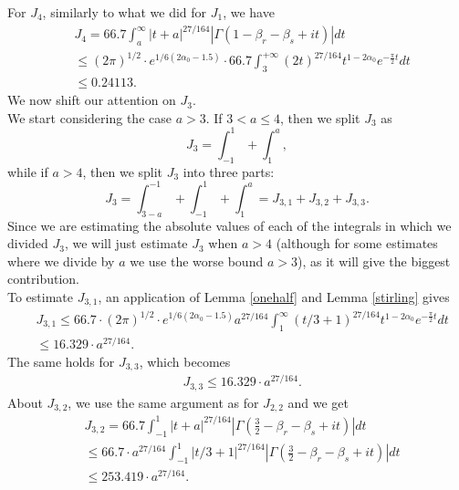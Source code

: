 \documentclass[reqno]{amsart}
\numberwithin{equation}{section}
\theoremstyle{remark}
\begin{document}
   For $J_4$, similarly to what we did for $J_1$, we have
    \begin{equation*}
        \begin{aligned}
            &J_4=66.7\int_{ a}^{\infty}\left|t+a\right|^{27/164}\left|\Gamma\left(1-\beta_r-\beta_s+it\right)\right|dt\\&\le (2\pi)^{1/2}\cdot e^{1/6(2\alpha_0-1.5)}\cdot 66.7 \int_{3}^{+\infty}(2t)^{ 27/164}t^{1-2\alpha_0}e^{-\frac{\pi}{2}t}dt\\&\le 0.24113.
        \end{aligned}
    \end{equation*}
    We now shift our attention on $J_3$.\\
    We start considering the case $a>3$. If $3<a\le 4$, then we split $J_3$ as 
    \[
    J_3=\int_{-1}^1+\int_{1}^a,
    \]
    while if $a>4$, then we split $J_3$ into three parts:
    \[
    J_3=\int_{3-a}^{-1}+\int_{-1}^1+\int_{1}^a=J_{3,1}+J_{3,2}+J_{3,3}.
    \]
    Since we are estimating the absolute values of each of the integrals in which we divided $J_3$, we will just estimate $J_3$ when $a>4$ (although for some estimates where we divide by $a$ we use the worse bound $a>3$), as it will give the biggest contribution.\\
     To estimate $J_{3,1}$, an application of Lemma \ref{onehalf} and Lemma \ref{stirling} gives
    \begin{equation*}
        \begin{aligned}
            &J_{3,1}\le 66.7\cdot (2\pi)^{1/2}\cdot e^{1/6(2\alpha_0-1.5)}a^{27/164}\int_{1}^{\infty}\left(t/3+1\right)^{27/164}t^{1-2\alpha_0}e^{-\frac{\pi}{2}t}dt\\&\le 16.329\cdot a^{27/164}.
        \end{aligned}
    \end{equation*}
    The same holds for $J_{3,3}$, which becomes
     \begin{equation*}
        \begin{aligned}
            &J_{3,3}\le 16.329\cdot a^{27/164}.
        \end{aligned}
    \end{equation*}
        About $J_{3,2}$, we use the same argument as for $J_{2,2}$ and we get
    \begin{equation*}
        \begin{aligned}
            &J_{3,2}=66.7\int_{-1}^{1}|t+a|^{27/164}\left|\Gamma\left(\frac{3}{2}-\beta_r-\beta_s+it\right)\right|dt\\&\le 66.7\cdot a^{27/164}\int_{-1}^1|t/3+1|^{27/164}\left|\Gamma\left(\frac{3}{2}-\beta_r-\beta_s+it\right)\right|dt\\&\le 253.419 \cdot a^{27/164}.
        \end{aligned}
    \end{equation*}
\end{document}

